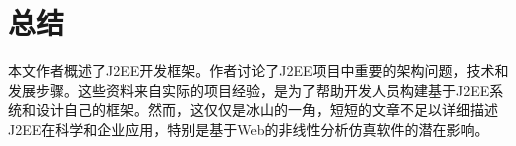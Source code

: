 
\chapter{总结}
本文作者概述了J2EE开发框架。作者讨论了J2EE项目中重要的架构问题，技术和发展步骤。这些资料来自实际的项目经验，是为了帮助开发人员构建基于J2EE系统和设计自己的框架。然而，这仅仅是冰山的一角，短短的文章不足以详细描述J2EE在科学和企业应用，特别是基于Web的非线性分析仿真软件的潜在影响。
